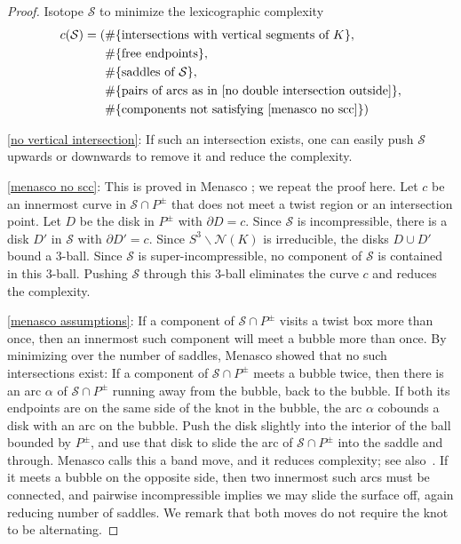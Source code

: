 \documentclass[12pt,reqno]{amsart}
\theoremstyle{plain}
\theoremstyle{definition}
\newcommand{\NN}{\mathcal{N}}
\newcommand{\calS}{\mathcal{S}}
\newcommand{\ssm}{\smallsetminus}
\begin{document}
\begin{proof}
Isotope $\calS$ to minimize the lexicographic complexity 
\begin{align*}
c(\calS)=(
&\#\{\text{intersections with vertical segments of }K\}, \\
&\#\{\text{free endpoints}\}, \\
&\#\{\text{saddles of $\calS$}\}, \\
&\#\{\text{pairs of arcs as in \ref{no double intersection outside}}\}, \\
&\#\{\text{components not satisfying \ref{menasco no scc}}\}
) 
\end{align*}

\ref{no vertical intersection}: If such an intersection exists, one can easily 
push $\calS$ upwards or downwards to remove it and reduce the complexity.

\ref{menasco no scc}: This is proved in Menasco \cite[Lemma 1]{menasco1984closed}; we 
repeat the proof here.
Let $c$ be an innermost curve in $\calS\cap P^\pm$ that does not meet a twist region 
or an intersection point. Let $D$ be the disk in $P^\pm$ with $\partial D = c$. Since 
$\calS$ is incompressible, there is a disk $D'$ in $\calS$ with $\partial D' = c$. 
Since $S^3 \ssm \NN(K)$ is irreducible, the disks $D\cup D'$ bound a 3-ball. Since $\calS$ is 
super-incompressible, no component of $\calS$ is contained in this 3-ball. Pushing 
$\calS$ through this 3-ball eliminates the curve $c$ and reduces the complexity. 

\ref{menasco assumptions}: If a component of $\calS\cap P^\pm$ visits a twist box more 
than once, then an innermost such component will meet a bubble more than once. By 
minimizing over the number of saddles, Menasco \cite[Lemma~1] {menasco1984closed} 
showed that no such intersections exist: If a component of $\calS\cap P^\pm$ meets 
a bubble twice, then there is an arc $\alpha$ of $\calS\cap P^\pm$ running away 
from the bubble, back to the bubble. If both its endpoints are on the same side of 
the knot in the bubble, the arc $\alpha$ cobounds a disk with an arc on the bubble. Push 
the disk slightly into the interior of the ball bounded by $P^\pm$, and use that disk 
to slide the arc of $\calS\cap P^\pm$ into the saddle and through. Menasco calls this 
a band move, and it reduces complexity; see 
also~\cite[Figure~14]{PurcellTsvietkovaI}. 
If it meets a bubble on the opposite side, then two innermost such arcs must be 
connected, and pairwise incompressible implies we may slide the surface off, again reducing 
number of saddles. We remark that both moves do not require the knot to be alternating.


\end{proof}
\end{document}
